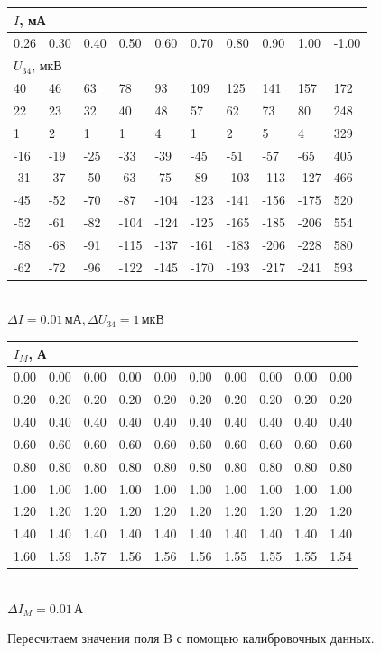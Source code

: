 \begin{center}
\begin{tabular}{|l|l|l|l|l|l|l|l|l|l|}
\hline
\multicolumn{10}{|l|}{$I$, мА}  \\ \hline
0.26 & 0.30 & 0.40 & 0.50 & 0.60 & 0.70 & 0.80 & 0.90 & 1.00 & -1.00 \\ \hline
\multicolumn{10}{|l|}{$U_{34}$, мкВ}  \\ \hline
40	&	46	&	63	&	78		&	93		&	109		&	125		&	141		&	157		&	172 \\ \hline
22	&	23	&	32	&	40		&	48		&	57		&	62		&	73		&	80		&	248 \\ \hline
1	&	2	&	1	&	1		&	4		&	1		&	2		&	5		&	4		&	329 \\ \hline
-16	&	-19	&	-25	&	-33		&	-39		&	-45		&	-51		&	-57		&	-65		&	405 \\ \hline
-31	&	-37	&	-50	&	-63		&	-75		&	-89		&	-103	&	-113	&	-127	&	466 \\ \hline
-45	&	-52	&	-70	&	-87		&	-104	&	-123	&	-141	&	-156	&	-175	&	520 \\ \hline
-52	&	-61	&	-82	&	-104	&	-124	&	-125	&	-165	&	-185	&	-206	&	554 \\ \hline
-58	&	-68	&	-91	&	-115	&	-137	&	-161	&	-183	&	-206	&	-228	&	580 \\ \hline
-62	&	-72	&	-96	&	-122	&	-145	&	-170	&	-193	&	-217	&	-241	&	593 \\ \hline
\end{tabular}\\[0.4cm]
$\Delta I = 0.01\,\text{мА}, \Delta U_{34} = 1\,\text{мкВ}$
\end{center}

\begin{center}
\begin{tabular}{|l|l|l|l|l|l|l|l|l|l|}
\hline
\multicolumn{10}{|l|}{$I_M$, А}  \\ \hline
0.00 & 0.00 & 0.00 & 0.00 & 0.00 & 0.00 & 0.00 & 0.00 & 0.00 & 0.00 \\ \hline
0.20 & 0.20 & 0.20 & 0.20 & 0.20 & 0.20 & 0.20 & 0.20 & 0.20 & 0.20 \\ \hline
0.40 & 0.40 & 0.40 & 0.40 & 0.40 & 0.40 & 0.40 & 0.40 & 0.40 & 0.40 \\ \hline
0.60 & 0.60 & 0.60 & 0.60 & 0.60 & 0.60 & 0.60 & 0.60 & 0.60 & 0.60 \\ \hline
0.80 & 0.80 & 0.80 & 0.80 & 0.80 & 0.80 & 0.80 & 0.80 & 0.80 & 0.80 \\ \hline
1.00 & 1.00 & 1.00 & 1.00 & 1.00 & 1.00 & 1.00 & 1.00 & 1.00 & 1.00 \\ \hline
1.20 & 1.20 & 1.20 & 1.20 & 1.20 & 1.20 & 1.20 & 1.20 & 1.20 & 1.20 \\ \hline
1.40 & 1.40 & 1.40 & 1.40 & 1.40 & 1.40 & 1.40 & 1.40 & 1.40 & 1.40 \\ \hline
1.60 & 1.59 & 1.57 & 1.56 & 1.56 & 1.56 & 1.55 & 1.55 & 1.55 & 1.54 \\ \hline
\end{tabular}\\[0.4cm]
$\Delta I_M = 0.01\,\text{А}$
\end{center}
Пересчитаем значения поля B с помощью калибровочных данных.

